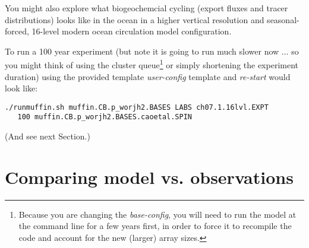 \noindent You might also explore what biogeochemcial cycling (export fluxes and tracer distributions) looks like in the ocean in a higher vertical resolution and seasonal-forced, 16-level modern ocean circulation model configuration.

To run a 100 year experiment (but note it is going to run much slower now ... so you might think of using the cluster queue\footnote{Because you are changing the \textit{base-config}, you will need to run the model at the command line for a few years first, in order to force it to recompile the code and account for the new (larger) array sizes.} or simply shortening the experiment duration) using the provided template \textit{user-config} template and \textit{re-start} would look like:
\vspace{-1mm}\small\begin{verbatim}
./runmuffin.sh muffin.CB.p_worjh2.BASES LABS ch07.1.16lvl.EXPT 
   100 muffin.CB.p_worjh2.BASES.caoetal.SPIN
\end{verbatim}\normalsize\vspace{-1mm}
(And see next Section.)

\newpage

\section{Comparing model vs. observations}

